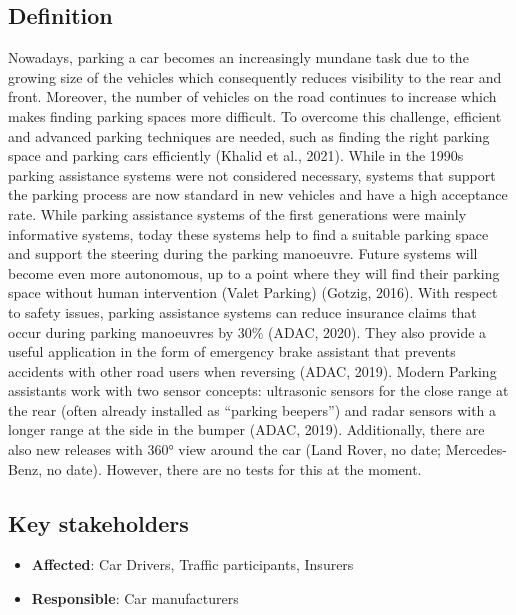 \documentclass[
]{book}
\providecommand{\tightlist}{%
  \setlength{\itemsep}{0pt}\setlength{\parskip}{0pt}}
\begin{document}
\hypertarget{definition-13}{%
\subsection*{Definition}\label{definition-13}}

Nowadays, parking a car becomes an increasingly mundane task due to the growing size of the vehicles which consequently reduces visibility to the rear and front. Moreover, the number of vehicles on the road continues to increase which makes finding parking spaces more difficult. To overcome this challenge, efficient and advanced parking techniques are needed, such as finding the right parking space and parking cars efficiently (Khalid et al., 2021).
While in the 1990s parking assistance systems were not considered necessary, systems that support the parking process are now standard in new vehicles and have a high acceptance rate. While parking assistance systems of the first generations were mainly informative systems, today these systems help to find a suitable parking space and support the steering during the parking manoeuvre. Future systems will become even more autonomous, up to a point where they will find their parking space without human intervention (Valet Parking) (Gotzig, 2016).
With respect to safety issues, parking assistance systems can reduce insurance claims that occur during parking manoeuvres by 30\% (ADAC, 2020). They also provide a useful application in the form of emergency brake assistant that prevents accidents with other road users when reversing (ADAC, 2019).
Modern Parking assistants work with two sensor concepts: ultrasonic sensors for the close range at the rear (often already installed as ``parking beepers'') and radar sensors with a longer range at the side in the bumper (ADAC, 2019). Additionally, there are also new releases with 360° view around the car (Land Rover, no date; Mercedes-Benz, no date). However, there are no tests for this at the moment.

\hypertarget{key-stakeholders-13}{%
\subsection*{Key stakeholders}\label{key-stakeholders-13}}

\begin{itemize}
\tightlist
\item
  \textbf{Affected}: Car Drivers, Traffic participants, Insurers
\item
  \textbf{Responsible}: Car manufacturers
\end{itemize}
\end{document}
